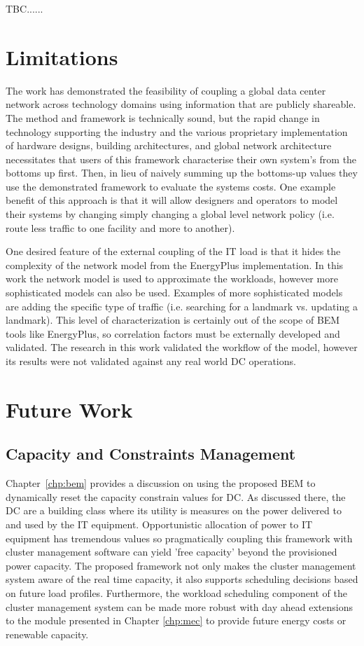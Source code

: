 TBC......

\section{Limitations}
The work has demonstrated the feasibility of coupling a global data center network across technology domains using information that are publicly shareable. The method and framework is technically sound, but the rapid change in technology supporting the industry and the various proprietary implementation of hardware designs, building architectures, and global network architecture necessitates that users of this framework characterise their own system's from the bottoms up first. Then, in lieu of naively summing up the bottoms-up values they use the demonstrated framework to evaluate the systems costs. One example benefit of this approach is that it will allow designers and operators to model their systems by changing simply changing a global level network policy (i.e. route less traffic to one facility and more to another).

One desired feature of the external coupling of the IT load is that it hides the complexity of the network model from the EnergyPlus implementation. In this work the network model is used to approximate the workloads, however more sophisticated models can also be used. Examples of more sophisticated models are adding the specific type of traffic (i.e. searching for a landmark vs. updating a landmark). This level of characterization is certainly out of the scope of BEM tools like EnergyPlus, so correlation factors must be externally developed and validated. The research in this work validated the workflow of the model, however its results were not validated against any real world DC operations. 


\section{Future Work}
\subsection{Capacity and Constraints Management}
Chapter~\ref{chp:bem} provides a discussion on using the proposed BEM to dynamically reset the capacity constrain values for DC. As discussed there, the DC are a building class where its utility is measures on the power delivered to and used by the IT equipment. Opportunistic allocation of power to IT equipment has tremendous values so pragmatically coupling this framework with cluster management software can yield 'free capacity' beyond the provisioned power capacity. The proposed framework not only makes the cluster management system aware of the real time capacity, it also supports scheduling decisions based on future load profiles. Furthermore, the workload scheduling component of the cluster management system can be made more robust with day ahead extensions to the module presented in Chapter \ref{chp:mec} to provide future energy costs or renewable capacity.


